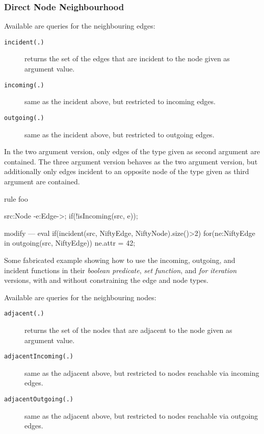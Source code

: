 \subsubsection*{Direct Node Neighbourhood}

Available are queries for the neighbouring edges:

\begin{description}
\item[\texttt{incident(.)}] returns the set of the edges that are incident to the node given as argument value.
\item[\texttt{incoming(.)}] same as the incident above, but restricted to incoming edges.
\item[\texttt{outgoing(.)}] same as the incident above, but restricted to outgoing edges.
\end{description}

In the two argument version, only edges of the type given as second argument are contained.
The three argument version behaves as the two argument version, but additionally only edges incident to an opposite node of the type given as third argument are contained.

\begin{example}
\begin{grgen}
rule foo {
    src:Node -e:Edge->; 
    if(!isIncoming(src, e));
    
    modify {
    ---
        eval {
            if(incident(src, NiftyEdge, NiftyNode).size()>2)
            {
                for(ne:NiftyEdge in outgoing(src, NiftyEdge))
                {
                    ne.attr = 42;
                }
            }
        }
    }
}
\end{grgen}
Some fabricated example showing how to use the incoming, outgoing, and incident functions in their \emph{boolean predicate}, \emph{set function}, and \emph{for iteration} versions, with and without constraining the edge and node types.
\end{example}

Available are queries for the neighbouring nodes:

\begin{description}
\item[\texttt{adjacent(.)}] returns the set of the nodes that are adjacent to the node given as argument value.
\item[\texttt{adjacentIncoming(.)}] same as the adjacent above, but restricted to nodes reachable via incoming edges.
\item[\texttt{adjacentOutgoing(.)}] same as the adjacent above, but restricted to nodes reachable via outgoing edges.
\end{description}

